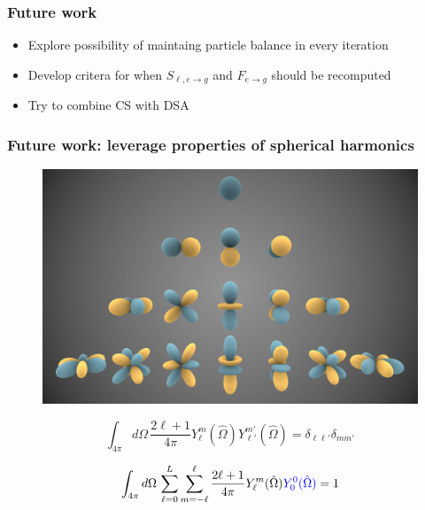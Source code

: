 \documentclass[xcolor=dvipsnames]{beamer}
\newlength{\wideitemsep}
\let\olditem\item
\renewcommand{\item}{\setlength{\itemsep}{\wideitemsep}\olditem}
\begin{document}
\begin{frame}
  \frametitle{Future work}

\begin{itemize}
\item Explore possibility of maintaing particle balance in every iteration
\item Develop critera for when $S_{\ell, e \to g}$ and $F_{e \to g}$ should be recomputed
\item Try to combine CS with DSA

\end{itemize}

\end{frame}

\begin{frame}
  \frametitle{Future work: leverage properties of spherical harmonics}

\begin{figure}[ht]
  \centering
\includegraphics[width=.6\textwidth]{./graphics/Spherical_Harmonics.png}
\end{figure}

\begin{equation*}
\int_{4\pi} d\Omega \, \frac{2\ell + 1}{4\pi} Y_\ell^m(\hat{\Omega}) Y_{\ell'}^{m'}(\hat{\Omega}) =  \delta_{\ell \ell'} \delta_{m m'} 
\end{equation*}


\begin{equation*}
\int_{4\pi} d\Omega \, \sum_{\ell = 0}^L \sum_{m=-\ell}^{\ell} \frac{2\ell + 1}{4\pi}  Y_\ell^m(\hat{\Omega}) \textcolor{blue}{Y_0^0(\hat{\Omega})} = 1
\end{equation*}

\end{frame}
\end{document}
